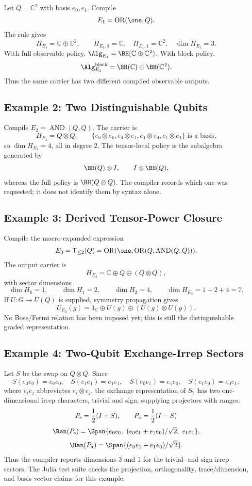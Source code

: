 Let \(Q=\mathbb C^2\) with basis \(e_0,e_1\).  Compile
\[
  E_1=\operatorname{OR}(\one,Q).
\]
The rule gives
\[
  H_{E_1}=\mathbb C\oplus\mathbb C^2,\qquad
  H_{E_1,0}=\mathbb C,\quad H_{E_1,1}=\mathbb C^2,\quad \dim H_{E_1}=3.
\]
With full observable policy, \(\Alg_{E_1}=\BH(\mathbb C\oplus\mathbb C^2)\).
With block policy,
\[
  \Alg_{E_1}^{\rm block}=\BH(\mathbb C)\oplus\BH(\mathbb C^2).
\]
Thus the same carrier has two different compiled observable outputs.

\subsection{Example 2: Two Distinguishable Qubits}

Compile \(E_2=\operatorname{AND}(Q,Q)\).  The carrier is
\[
  H_{E_2}=Q\otimes Q,\qquad
  \{e_0\otimes e_0,e_0\otimes e_1,e_1\otimes e_0,e_1\otimes e_1\}
  \text{ is a basis,}
\]
so \(\dim H_{E_2}=4\), all in degree \(2\).  The tensor-local policy is the
subalgebra generated by
\[
  \BH(Q)\otimes I,\qquad I\otimes \BH(Q),
\]
whereas the full policy is \(\BH(Q\otimes Q)\).  The compiler records which one
was requested; it does not identify them by syntax alone.

\subsection{Example 3: Derived Tensor-Power Closure}

Compile the macro-expanded expression
\[
  E_3=\mathsf T_{\le2}(Q)=\operatorname{OR}(\one,\operatorname{OR}(Q,\operatorname{AND}(Q,Q))).
\]
The output carrier is
\[
  H_{E_3}=\mathbb C\oplus Q\oplus(Q\otimes Q),
\]
with sector dimensions
\[
  \dim H_{0}=1,\qquad \dim H_{1}=2,\qquad \dim H_{2}=4,\qquad
  \dim H_{E_3}=1+2+4=7.
\]
If \(U:G\to U(Q)\) is supplied, symmetry propagation gives
\[
  U_{E_3}(g)=1_{\mathbb C}\oplus U(g)\oplus (U(g)\otimes U(g)).
\]
No Bose/Fermi relation has been imposed yet; this is still the distinguishable
graded representation.

\subsection{Example 4: Two-Qubit Exchange-Irrep Sectors}

Let \(S\) be the swap on \(Q\otimes Q\).  Since
\[
S(e_0e_0)=e_0e_0,\quad S(e_1e_1)=e_1e_1,\quad
S(e_0e_1)=e_1e_0,\quad S(e_1e_0)=e_0e_1,
\]
where \(e_ie_j\) abbreviates \(e_i\otimes e_j\), the exchange representation of
\(S_2\) has two one-dimensional irrep characters, trivial and sign, supplying
projectors with ranges:
\[
  P_{\rm s}=\frac12(I+S),\qquad P_{\rm a}=\frac12(I-S)
\]
\[
  \Ran(P_{\rm s})=\Span\{e_0e_0,\ (e_0e_1+e_1e_0)/\sqrt2,\ e_1e_1\},
\]
\[
  \Ran(P_{\rm a})=\Span\{(e_0e_1-e_1e_0)/\sqrt2\}.
\]
Thus the compiler reports dimensions \(3\) and \(1\) for the trivial- and
sign-irrep sectors.  The Julia test suite checks the projection, orthogonality,
trace/dimension, and basis-vector claims for this example.

